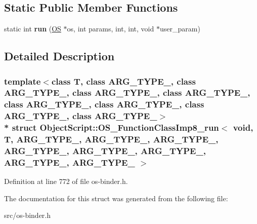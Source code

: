 \subsection*{Static Public Member Functions}
\begin{DoxyCompactItemize}
\item 
static int {\bfseries run} (\hyperlink{class_object_script_1_1_o_s}{OS} $\ast$os, int params, int, int, void $\ast$user\+\_\+param)\hypertarget{struct_object_script_1_1_o_s___function_class_imp8__run_3_01void_00_01_t_00_01_01_01_a_r_g___t_yb85b6ee4d7bc79b1c9283f88811a7efc_ac19d1da25d8b9f645e472ff0f4968736}{}\label{struct_object_script_1_1_o_s___function_class_imp8__run_3_01void_00_01_t_00_01_01_01_a_r_g___t_yb85b6ee4d7bc79b1c9283f88811a7efc_ac19d1da25d8b9f645e472ff0f4968736}

\end{DoxyCompactItemize}


\subsection{Detailed Description}
\subsubsection*{template$<$class T, class A\+R\+G\+\_\+\+T\+Y\+P\+E\+\_, class A\+R\+G\+\_\+\+T\+Y\+P\+E\+\_, class A\+R\+G\+\_\+\+T\+Y\+P\+E\+\_, class A\+R\+G\+\_\+\+T\+Y\+P\+E\+\_, class A\+R\+G\+\_\+\+T\+Y\+P\+E\+\_, class A\+R\+G\+\_\+\+T\+Y\+P\+E\+\_, class A\+R\+G\+\_\+\+T\+Y\+P\+E\+\_, class A\+R\+G\+\_\+\+T\+Y\+P\+E\+\_$>$\\*
struct Object\+Script\+::\+O\+S\+\_\+\+Function\+Class\+Imp8\+\_\+run$<$ void, T,   A\+R\+G\+\_\+\+T\+Y\+P\+E\+\_, A\+R\+G\+\_\+\+T\+Y\+P\+E\+\_, A\+R\+G\+\_\+\+T\+Y\+P\+E\+\_, A\+R\+G\+\_\+\+T\+Y\+P\+E\+\_, A\+R\+G\+\_\+\+T\+Y\+P\+E\+\_, A\+R\+G\+\_\+\+T\+Y\+P\+E\+\_, A\+R\+G\+\_\+\+T\+Y\+P\+E\+\_, A\+R\+G\+\_\+\+T\+Y\+P\+E\+\_ $>$}



Definition at line 772 of file os-\/binder.\+h.



The documentation for this struct was generated from the following file\+:\begin{DoxyCompactItemize}
\item 
src/os-\/binder.\+h\end{DoxyCompactItemize}
